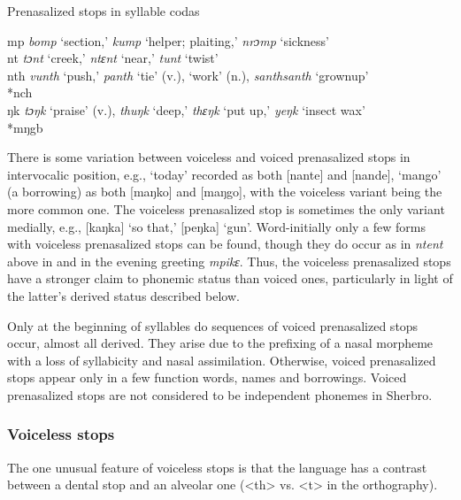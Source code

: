 \ea  %
\label{ex:18}
Prenasalized stops in syllable codas\\
\vspace{6pt}
\TabPositions{1.25cm,2cm,3cm,5cm}

mp \tab \textit{bomp} ‘section,' \textit{kump} ‘helper; plaiting,' \textit{nrɔmp} ‘sickness'\\
nt \tab \textit{tɔnt} ‘creek,' \textit{ntɛnt} ‘near,' \textit{tunt} ‘twist'\\
nth \tab \textit{vunth} ‘push,' \textit{panth} ‘tie' (v.), ‘work' (n.), \textit{santhsanth} ‘grownup'\\
*nch\\
ŋk \tab \textit{tɔŋk} ‘praise' (v.), \textit{thuŋk} ‘deep,' \textit{thɛŋk} ‘put up,' \textit{yeŋk} ‘insect wax'\\
*mŋgb\\
\z

There is some variation between voiceless and voiced prenasalized stops in intervocalic position, e.g., ‘today' recorded as both [nante] and [nande], ‘mango' (a borrowing) as both [maŋko] and [maŋgo], with the voiceless variant being the more common one. The voiceless prenasalized stop is sometimes the only variant medially, e.g., [kaŋka] ‘so that,' [peŋka] ‘gun'. Word-initially only a few forms with voiceless prenasalized stops can be found, though they do occur as in \textit{ntent} above in  and in the evening greeting \textit{mpikɛ}. Thus, the voiceless prenasalized stops have a stronger claim to phonemic status than voiced ones, particularly in light of the latter's derived status described below.

Only at the beginning of syllables do sequences of voiced prenasalized stops occur, almost all derived. They arise due to the prefixing of a nasal morpheme with a loss of syllabicity and nasal assimilation. Otherwise, voiced prenasalized stops appear only in a few function words, names and borrowings. Voiced prenasalized stops are not considered to be independent phonemes in Sherbro.

\subsubsection{Voiceless stops}
\label{sec:2.1.2.3}
The one unusual feature of voiceless stops is that the language has a contrast between a dental stop and an alveolar one (<th> vs. <t> in the orthography).

